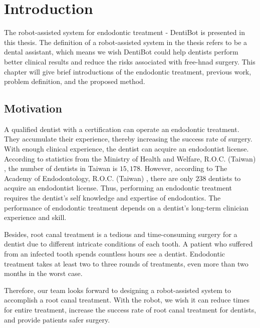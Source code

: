 \chapter{Introduction}
\hspace*{6mm}The robot-assisted system for endodontic treatment - DentiBot is presented in this thesis. The definition of a robot-assisted system in the thesis refers to be a dental assistant, which means we wish DentiBot could help dentists perform better clinical results and reduce the risks associated with free-hnad surgery. This chapter will give brief introductions of the endodontic treatment, previous work, problem definition, and the proposed method.
\section{Motivation}
\hspace*{6mm}A qualified dentist with a certification can operate an endodontic treatment. They accumulate their experience, thereby increasing the success rate of surgery. With enough clinical experience, the dentist can acquire an endodontist license. According to statistics from the Ministry of Health and Welfare, R.O.C. (Taiwan) \cite{web1}, the number of dentists in Taiwan is $15,178$. However, according to The Academy of Endodontology, R.O.C. (Taiwan) \cite{web2}, there are only $238$ dentists to acquire an endodontist license. Thus, performing an endodontic treatment requires the dentist's self knowledge and expertise of endodontics. The performance of endodontic treatment depends on a dentist's long-term clinician experience and skill. 
\par
Besides, root canal treatment is a tedious and time-consuming surgery for a dentist due to different intricate conditions of each tooth. A patient who suffered from an infected tooth spends countless hours see a dentist. Endodontic treatment takes at least two to three rounds of treatments, even more than two months in the worst case.  
\par
Therefore, our team looks forward to designing a robot-assisted system to accomplish a root canal treatment.  With the robot, we wish it can reduce times for entire treatment, increase the success rate of root canal treatment for dentists, and provide patients safer surgery.
